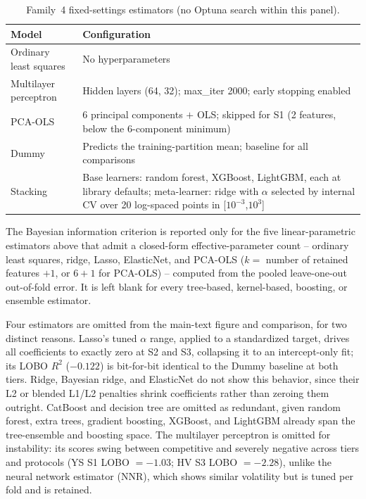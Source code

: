 \documentclass[a4paper,11pt]{article}
\begin{document}
\begin{table}[H]
\centering
\caption{Family~4 fixed-settings estimators (no Optuna search within this panel).}
\label{tab:armote_fixed}
\small
\begin{tabular}{@{}lp{7.4cm}@{}}
\toprule
Model & Configuration \\
\midrule
Ordinary least squares & No hyperparameters \\
Multilayer perceptron & Hidden layers (64, 32); max\_iter 2000; early stopping enabled \\
PCA-OLS & 6 principal components $+$ OLS; skipped for S1 (2 features, below the 6-component minimum) \\
Dummy & Predicts the training-partition mean; baseline for all comparisons \\
Stacking & Base learners: random forest, XGBoost, LightGBM, each at library defaults; meta-learner: ridge with $\alpha$ selected by internal CV over 20 log-spaced points in [$10^{-3}$,$10^{3}$] \\
\bottomrule
\end{tabular}
\end{table}

The Bayesian information criterion is reported only for the five linear-parametric estimators above that admit a closed-form effective-parameter count -- ordinary least squares, ridge, Lasso, ElasticNet, and PCA-OLS ($k=$ number of retained features $+1$, or $6+1$ for PCA-OLS) -- computed from the pooled leave-one-out out-of-fold error. It is left blank for every tree-based, kernel-based, boosting, or ensemble estimator.

Four estimators are omitted from the main-text figure and comparison, for two distinct reasons. Lasso's tuned $\alpha$ range, applied to a standardized target, drives all coefficients to exactly zero at S2 and S3, collapsing it to an intercept-only fit; its LOBO $R^2$ ($-0.122$) is bit-for-bit identical to the Dummy baseline at both tiers. Ridge, Bayesian ridge, and ElasticNet do not show this behavior, since their L2 or blended L1/L2 penalties shrink coefficients rather than zeroing them outright. CatBoost and decision tree are omitted as redundant, given random forest, extra trees, gradient boosting, XGBoost, and LightGBM already span the tree-ensemble and boosting space. The multilayer perceptron is omitted for instability: its scores swing between competitive and severely negative across tiers and protocols (YS S1 LOBO $=-1.03$; HV S3 LOBO $=-2.28$), unlike the neural network estimator (NNR), which shows similar volatility but is tuned per fold and is retained.
\end{document}

